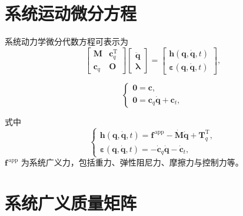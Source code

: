 \section{系统运动微分方程}

系统动力学微分代数方程可表示为
\begin{equation}\label{eq:11.1}
\begin{bmatrix}
\boldsymbol{M} & \boldsymbol{c}_{q}^{\mathrm{T}} \\[4pt]
\boldsymbol{c}_{q} & \boldsymbol{O}
\end{bmatrix}
\begin{bmatrix}
\ddot{\boldsymbol{q}} \\[4pt]
\boldsymbol{\lambda}
\end{bmatrix}
=
\begin{bmatrix}
\boldsymbol{h}(\boldsymbol{q}, \dot{\boldsymbol{q}}, t) \\[4pt]
\boldsymbol{\varepsilon}(\boldsymbol{q}, \dot{\boldsymbol{q}}, t)
\end{bmatrix},
\end{equation}

\begin{equation}\label{eq:11.2}
\begin{cases}
\boldsymbol{0} = \boldsymbol{c}, \\[4pt]
\boldsymbol{0} = \boldsymbol{c}_{q} \dot{\boldsymbol{q}} + \boldsymbol{c}_{t},
\end{cases}
\end{equation}

式中
\begin{equation}\label{eq:11.3}
\begin{cases}
\boldsymbol{h}(\boldsymbol{q}, \dot{\boldsymbol{q}}, t) = \boldsymbol{f}^{\,\mathrm{app}} - \dot{\boldsymbol{M}} \dot{\boldsymbol{q}} + \boldsymbol{T}_{q}^{\mathrm{T}}, \\[8pt]
\boldsymbol{\varepsilon}(\boldsymbol{q}, \dot{\boldsymbol{q}}, t) = -\dot{\boldsymbol{c}}_{q} \dot{\boldsymbol{q}} - \dot{\boldsymbol{c}}_{t},
\end{cases}
\end{equation}
$\boldsymbol{f}^{\,\mathrm{app}}$ 为系统广义力，包括重力、弹性阻尼力、摩擦力与控制力等。

\section{系统广义质量矩阵}

